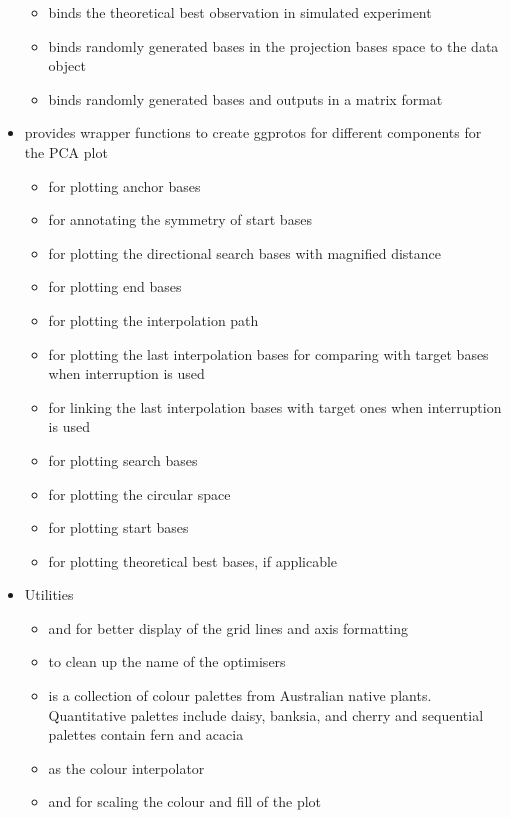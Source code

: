 \begin{itemize}
  \begin{itemize}
  \tightlist
  \item
     binds the theoretical best observation in
    simulated experiment
  \item
     binds randomly generated bases in the
    projection bases space to the data object
  \item
     binds randomly generated bases and
    outputs in a matrix format
  \end{itemize}
\item
   provides wrapper functions to create ggprotos for
  different components for the PCA plot

  \begin{itemize}
  \tightlist
  \item
     for plotting anchor bases
  \item
     for annotating the symmetry of start bases
  \item
     for plotting the directional search bases
    with magnified distance
  \item
     for plotting end bases
  \item
     for plotting the interpolation path
  \item
     for plotting the last interpolation bases
    for comparing with target bases when interruption is used
  \item
     for linking the last interpolation bases
    with target ones when interruption is used
  \item
     for plotting search bases
  \item
     for plotting the circular space
  \item
     for plotting start bases
  \item
     for plotting theoretical best bases, if
    applicable
  \end{itemize}
\item
  Utilities

  \begin{itemize}
  \tightlist
  \item
     and  for better display
    of the grid lines and axis formatting
  \item
     to clean up the name of the optimisers
  \item
     is a collection of colour palettes from
    Australian native plants. Quantitative palettes include daisy,
    banksia, and cherry and sequential palettes contain fern and acacia
  \item
     as the colour interpolator
  \item
     and  for scaling the
    colour and fill of the plot
  \end{itemize}
\end{itemize}

